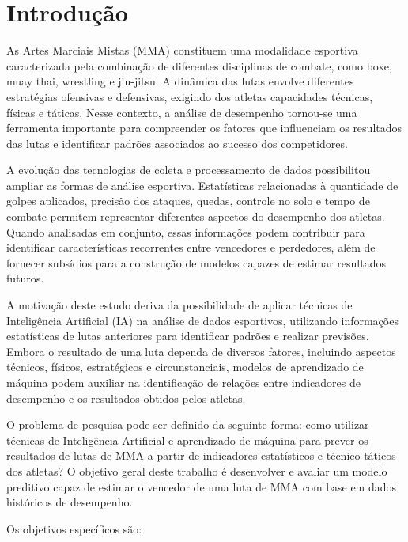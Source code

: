 \documentclass[12pt,a4paper]{report}
\begin{document}
\chapter{Introdução}

As Artes Marciais Mistas (MMA) constituem uma modalidade esportiva caracterizada pela combinação de diferentes disciplinas de combate, como boxe, muay thai, wrestling e jiu-jitsu. A dinâmica das lutas envolve diferentes estratégias ofensivas e defensivas, exigindo dos atletas capacidades técnicas, físicas e táticas. Nesse contexto, a análise de desempenho tornou-se uma ferramenta importante para compreender os fatores que influenciam os resultados das lutas e identificar padrões associados ao sucesso dos competidores.

A evolução das tecnologias de coleta e processamento de dados possibilitou ampliar as formas de análise esportiva. Estatísticas relacionadas à quantidade de golpes aplicados, precisão dos ataques, quedas, controle no solo e tempo de combate permitem representar diferentes aspectos do desempenho dos atletas. Quando analisadas em conjunto, essas informações podem contribuir para identificar características recorrentes entre vencedores e perdedores, além de fornecer subsídios para a construção de modelos capazes de estimar resultados futuros.

A motivação deste estudo deriva da possibilidade de aplicar técnicas de Inteligência Artificial (IA) na análise de dados esportivos, utilizando informações estatísticas de lutas anteriores para identificar padrões e realizar previsões. Embora o resultado de uma luta dependa de diversos fatores, incluindo aspectos técnicos, físicos, estratégicos e circunstanciais, modelos de aprendizado de máquina podem auxiliar na identificação de relações entre indicadores de desempenho e os resultados obtidos pelos atletas.

O problema de pesquisa pode ser definido da seguinte forma: como utilizar técnicas de Inteligência Artificial e aprendizado de máquina para prever os resultados de lutas de MMA a partir de indicadores estatísticos e técnico-táticos dos atletas? O objetivo geral deste trabalho é desenvolver e avaliar um modelo preditivo capaz de estimar o vencedor de uma luta de MMA com base em dados históricos de desempenho.

Os objetivos específicos são:
\end{document}
